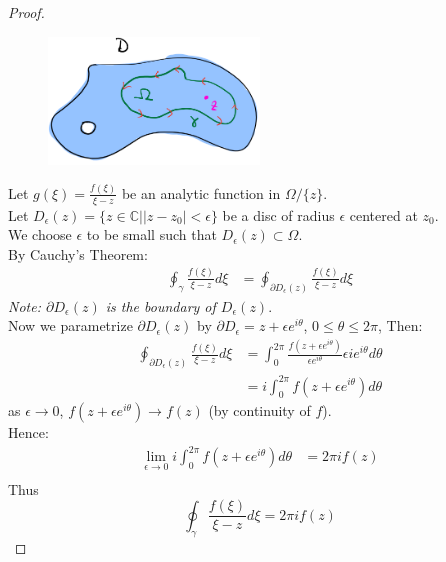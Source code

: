 \begin{proof}
    \begin{figure}[H]
        \centering
        \includegraphics[width=0.5\textwidth]{LECTURE_7/cauchy-integral.png}
    \end{figure}
    Let $g(\xi) = \frac{f(\xi)}{\xi - z}$ be an analytic function in $\Omega/\{z\}$.\\
    Let $D_{\epsilon}(z) = \{z \in \mathbb{C} | |z - z_0| < \epsilon\}$ be a disc of radius $\epsilon$ centered at $z_0$.\\
    We choose $\epsilon$ to be small such that $D_{\epsilon}(z) \subset \Omega$.\\
    By Cauchy's Theorem:
    \begin{align*}
        \oint_{\gamma} \frac{f(\xi)}{\xi - z} d\xi & = \oint_{\partial D_{\epsilon}(z)} \frac{f(\xi)}{\xi - z} d\xi
    \end{align*}
    \textit{Note: $\partial D_{\epsilon}(z)$ is the boundary of $D_{\epsilon}(z)$}.\\
    Now we parametrize $\partial D_{\epsilon}(z)$ by $\partial D_{\epsilon} = z + \epsilon e^{i\theta}$, $0 \leq \theta \leq 2\pi$, Then:
    \begin{align*}
        \oint_{\partial D_{\epsilon}(z)} \frac{f(\xi)}{\xi - z} d\xi & = \int_{0}^{2\pi} \frac{f(z + \epsilon e^{i\theta})}{\epsilon e^{i\theta}} \epsilon i e^{i\theta} d\theta \\
                                                                     & = i \int_{0}^{2\pi} f(z + \epsilon e^{i\theta}) d\theta
    \end{align*}
    as $\epsilon \to 0$, $f(z + \epsilon e^{i\theta}) \to f(z)$ (by continuity of $f$).\\
    Hence:
    \begin{align*}
        \lim_{\epsilon \to 0} i \int_{0}^{2\pi} f(z + \epsilon e^{i\theta}) d\theta & = 2\pi i f(z) \\
    \end{align*}
    Thus
    $$\boxed{\oint_{\gamma} \frac{f(\xi)}{\xi - z} d\xi = 2\pi i f(z)}$$
\end{proof}

